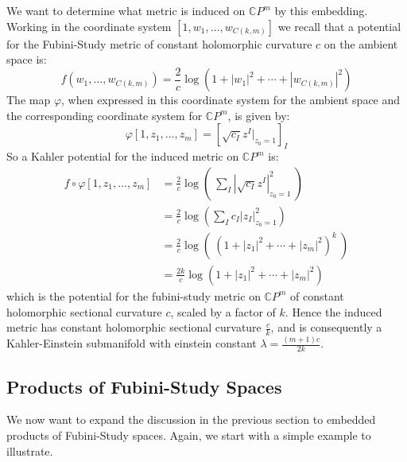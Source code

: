 \documentclass[11pt]{amsart}
\theoremstyle{definition}
\def \CP{ \mathbb{C}P }
\begin{document}
We want to determine what metric is induced on $\CP^m$ by this embedding.  Working in the coordinate system $[1, w_1, \ldots, w_{C(k,m)}]$ we recall that a potential for the Fubini-Study metric of constant holomorphic curvature $c$ on the ambient space is:
%
$$ f( w_1, \ldots, w_{C(k,m)} ) = \frac{2}{c} \log ( 1 + |w_1|^2 + \cdots + | w_{C(k,m)} |^2 ) $$
%
The map $\varphi$, when expressed in this coordinate system for the ambient space and the corresponding coordinate system for $\CP^m$, is given by:
%
$$ \varphi[ 1, z_1, \ldots, z_m ] = \left[ \sqrt{ c_I } z^I |_{z_0 = 1} \right]_I $$
%
So a Kahler potential for the induced metric on $\CP^m$ is:
%
\begin{align*}
f \circ \varphi[ 1, z_1, \ldots, z_m ] &= \frac{2}{c} \log \left( \ \sum_I | \sqrt{ c_I } z^I  |^2_{z_0 = 1} \ \right) \\
&= \frac{2}{c} \log \left( \sum_I c_I |z_I|^2_{z_0 = 1} \right) \\
&= \frac{2}{c} \log( \ ( 1 + |z_1|^2 + \cdots + |z_m|^2 )^k \ ) \\
&= \frac{2k}{c} \log( 1 + |z_1|^2 + \cdots + |z_m|^2 ) 
\end{align*}
%
which is the potential for the fubini-study metric on $\CP^m$ of constant holomorphic sectional curvature $c$, scaled by a factor of $k$.  Hence the induced metric has constant holomorphic sectional curvature $\frac{c}{k}$, and is consequently a Kahler-Einstein submanifold with einstein constant $\lambda = \frac{(m+1)c}{2k}$.

\subsection{ Products of Fubini-Study Spaces }

We now want to expand the discussion in the previous section to embedded products of Fubini-Study spaces.  Again, we start with a simple example to illustrate.
\end{document}
